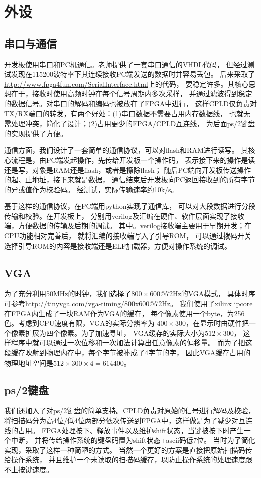
\section{外设}
\subsection{串口与通信}
开发板使用串口和PC机通信。老师提供了一套串口通信的VHDL代码，
但经过测试发现在115200波特率下其连续接收PC端发送的数据时并容易丢包。
后来采取了\url{http://www.fpga4fun.com/SerialInterface.html}上的代码，
要稳定许多。其核心思想在于，接收时使用高频时钟在每个信号周期内多次采样，
并通过滤波得到稳定的数据信号。对串口的解码和编码也被放在了FPGA中进行，
这样CPLD仅负责对TX/RX端口的转发，有两个好处：(1)串口数据不需要占用内存数据线，
也就无需处理冲突，简化了设计；(2)占用更少的FPGA/CPLD互连线，
为后面ps/2键盘的实现提供了方便。

通信方面，我们设计了一套简单的通信协议，可以对flash和RAM进行读写。
其核心流程是，由PC端发起操作，先传给开发板一个操作码，
表示接下来的操作是读还是写，对象是RAM还是flash，或者是擦除flash；
随后PC端向开发板传送操作的起、止地址，接下来就是数据，
通信结束后开发板向PC返回接收到的所有字节的异或值作为校验码。
经测试，实际传输速率约10k/s。

基于这样的通信协议，在PC端用python实现了通信库，
可以对大段数据进行分段传输和校验。在开发板上，
分别用verilog及汇编在硬件、软件层面实现了接收端，方便数据的传输及后期的调试。
其中。verilog接收端主要用于早期开发；在CPU功能相对完善后，
就将汇编的接收端写入了引导ROM，
可以通过拨码开关选择引导ROM的内容是接收端还是ELF加载器，方便对操作系统的调试。


\subsection{VGA\label{sec:vga}}
为了充分利用50MHz的时钟，我们选择了$800\times 600$@72Hz的VGA模式，
具体时序可参考\url{http://tinyvga.com/vga-timing/800x600@72Hz}。
我们使用了xilinx ipcore在FPGA内生成了一块RAM作为VGA的缓存，
每个像素使用一个byte，为256色。考虑到CPU速度有限，VGA的实际分辨率为
$400\times 300$，在显示时由硬件把一个像素扩展为四个像素。为了加速寻址，
VGA缓存的实际大小为$512 \times 300$，
这样程序中就可以通过一次位移和一次加法计算出任意像素的偏移量。
而为了把这段缓存映射到物理内存中，每个字节被补成了4字节的字，
因此VGA缓存占用的物理地址空间是$512\times 300 \times 4 = 614400$。


\subsection{ps/2键盘\label{sec:ps2}}
我们还加入了对ps/2键盘的简单支持。CPLD负责对原始的信号进行解码及校验，
将扫描码分为高4位/低4位两部分依次传送到FPGA中，这样做是为了减少对互连线的占用。
FPGA处理按下、释放事件以及维护shift状态，当键被按下时产生一个中断，
并将传给操作系统的键盘码置为shift状态+ascii码低7位。
当时为了简化实现，采取了这样一种简陋的方式。
当然一个更好的方案是直接把原始扫描码传给操作系统，
并且维护一个未读取的扫描码缓存，以防止操作系统的处理速度跟不上按键速度。


